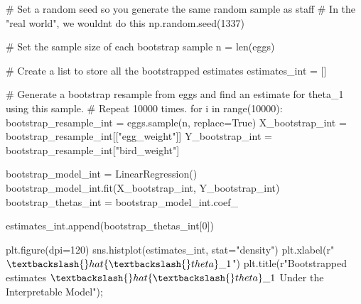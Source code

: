 \documentclass[
  letterpaper,
  DIV=11,
  numbers=noendperiod]{scrreprt}
\newenvironment{Shaded}{\begin{snugshade}}{\end{snugshade}}
\newcommand{\BuiltInTok}[1]{\textcolor[rgb]{0.00,0.23,0.31}{#1}}
\newcommand{\CommentTok}[1]{\textcolor[rgb]{0.37,0.37,0.37}{#1}}
\newcommand{\ControlFlowTok}[1]{\textcolor[rgb]{0.00,0.23,0.31}{#1}}
\newcommand{\DecValTok}[1]{\textcolor[rgb]{0.68,0.00,0.00}{#1}}
\newcommand{\KeywordTok}[1]{\textcolor[rgb]{0.00,0.23,0.31}{#1}}
\newcommand{\NormalTok}[1]{\textcolor[rgb]{0.00,0.23,0.31}{#1}}
\newcommand{\OperatorTok}[1]{\textcolor[rgb]{0.37,0.37,0.37}{#1}}
\newcommand{\StringTok}[1]{\textcolor[rgb]{0.13,0.47,0.30}{#1}}
\newcommand{\VariableTok}[1]{\textcolor[rgb]{0.07,0.07,0.07}{#1}}
\newcommand{\VerbatimStringTok}[1]{\textcolor[rgb]{0.13,0.47,0.30}{#1}}
\begin{document}
\begin{Shaded}
\begin{Highlighting}[]
\CommentTok{\# Set a random seed so you generate the same random sample as staff}
\CommentTok{\# In the "real world", we wouldn\textquotesingle{}t do this}
\NormalTok{np.random.seed(}\DecValTok{1337}\NormalTok{)}

\CommentTok{\# Set the sample size of each bootstrap sample}
\NormalTok{n }\OperatorTok{=} \BuiltInTok{len}\NormalTok{(eggs)}

\CommentTok{\# Create a list to store all the bootstrapped estimates}
\NormalTok{estimates\_int }\OperatorTok{=}\NormalTok{ []}

\CommentTok{\# Generate a bootstrap resample from \textasciigrave{}eggs\textasciigrave{} and find an estimate for theta\_1 using this sample. }
\CommentTok{\# Repeat 10000 times.}
\ControlFlowTok{for}\NormalTok{ i }\KeywordTok{in} \BuiltInTok{range}\NormalTok{(}\DecValTok{10000}\NormalTok{):}
\NormalTok{    bootstrap\_resample\_int }\OperatorTok{=}\NormalTok{ eggs.sample(n, replace}\OperatorTok{=}\VariableTok{True}\NormalTok{)}
\NormalTok{    X\_bootstrap\_int }\OperatorTok{=}\NormalTok{ bootstrap\_resample\_int[[}\StringTok{"egg\_weight"}\NormalTok{]]}
\NormalTok{    Y\_bootstrap\_int }\OperatorTok{=}\NormalTok{ bootstrap\_resample\_int[}\StringTok{"bird\_weight"}\NormalTok{]}
    
\NormalTok{    bootstrap\_model\_int }\OperatorTok{=}\NormalTok{ LinearRegression()}
\NormalTok{    bootstrap\_model\_int.fit(X\_bootstrap\_int, Y\_bootstrap\_int)}
\NormalTok{    bootstrap\_thetas\_int }\OperatorTok{=}\NormalTok{ bootstrap\_model\_int.coef\_}
    
\NormalTok{    estimates\_int.append(bootstrap\_thetas\_int[}\DecValTok{0}\NormalTok{])}

\NormalTok{plt.figure(dpi}\OperatorTok{=}\DecValTok{120}\NormalTok{)}
\NormalTok{sns.histplot(estimates\_int, stat}\OperatorTok{=}\StringTok{"density"}\NormalTok{)}
\NormalTok{plt.xlabel(}\VerbatimStringTok{r"$\textbackslash{}hat\{\textbackslash{}theta\}\_1$"}\NormalTok{)}
\NormalTok{plt.title(}\VerbatimStringTok{r"Bootstrapped estimates $\textbackslash{}hat\{\textbackslash{}theta\}\_1$ Under the Interpretable Model"}\NormalTok{)}\OperatorTok{;}
\end{Highlighting}
\end{Shaded}
\end{document}
